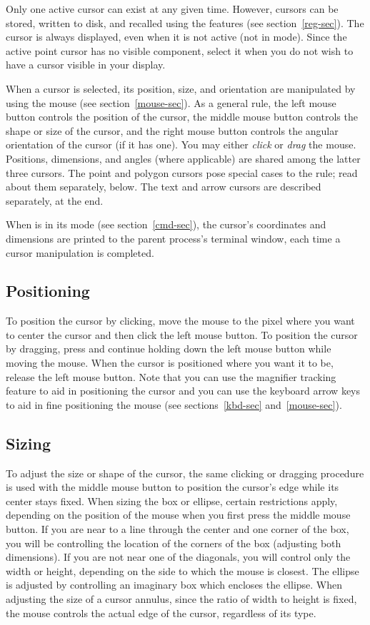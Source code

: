 Only one active cursor can exist at any given time.  However, cursors can
be stored, written to disk, and recalled using the  features (see
section~\ref{reg-sec}).  The cursor is always displayed, even when it is not
active (not in  mode).  Since the active point cursor has no visible
component, select it when you do not wish to have a cursor visible in your
display.

When a cursor is selected, its position, size, and orientation are
manipulated by using the mouse (see section~\ref{mouse-sec}).  As a
general rule, the left mouse button controls the position of the cursor,
the middle mouse button controls the shape or size of the cursor, and
the right mouse button controls the angular orientation of the cursor (if
it has one).  You may either {\em click} or {\em drag} the mouse.  Positions,
dimensions, and angles (where applicable) are shared among the latter
three cursors.  The point and polygon cursors pose special cases to the
rule; read about them separately, below.  The text and arrow cursors
are described separately, at the end.

When {\SAO} is in its  mode (see section~\ref{cmd-sec}), the cursor's
coordinates and dimensions are printed to the parent process's terminal
window, each time a cursor manipulation is completed.

\subsection{ Positioning }

To position the cursor by clicking, move the mouse to the pixel where
you want to center the cursor and then click the left mouse button.
To position the cursor by dragging, press and continue holding down
the left mouse button while moving the mouse.  When the cursor is
positioned where you want it to be, release the left mouse button.
Note that you can use the magnifier tracking feature to aid in
positioning the cursor and you can use the keyboard arrow keys to aid in
fine positioning the mouse (see sections~\ref{kbd-sec} and~\ref{mouse-sec}).


\subsection{ Sizing }

To adjust the size or shape of the cursor, the same clicking or dragging
procedure is used with the middle mouse button to position the cursor's
edge while its center stays fixed.  When sizing the box or ellipse,
certain restrictions apply, depending on the position of the mouse when
you first press the middle mouse button.  If you are near to a line
through the center and one corner of the box, you will be controlling the
location of the corners of the box (adjusting both dimensions).  If you
are not near one of the diagonals, you will control only the width or
height, depending on the side to which the mouse is closest.  The ellipse
is adjusted by controlling an imaginary box which encloses the ellipse.
When adjusting the size of a cursor annulus, since the ratio of width
to height is fixed, the mouse controls the actual edge of the cursor,
regardless of its type.

